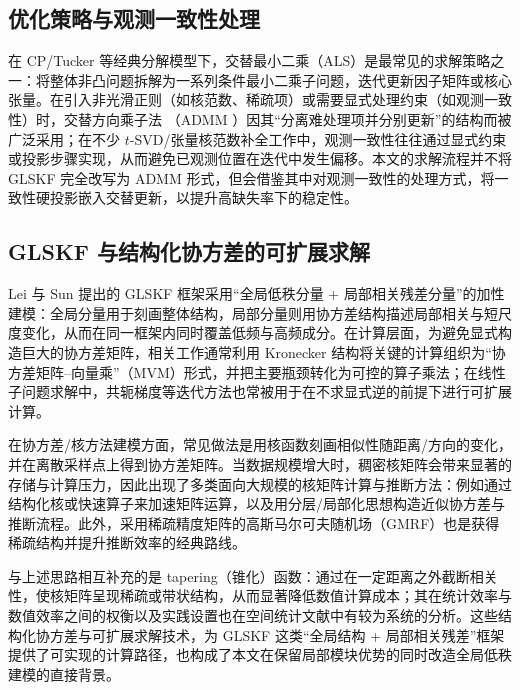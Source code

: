 \documentclass[UTF8]{ctexart}
\begin{document}
\subsection{优化策略与观测一致性处理}
在 CP/Tucker 等经典分解模型下，交替最小二乘（ALS）是最常见的求解策略之一：将整体非凸问题拆解为一系列条件最小二乘子问题，迭代更新因子矩阵或核心张量\cite{kolda2009tensor}。在引入非光滑正则（如核范数、稀疏项）或需要显式处理约束（如观测一致性）时，交替方向乘子法 （ADMM ）因其“分离难处理项并分别更新”的结构而被广泛采用\cite{boyd2011admm}；在不少 $t$-SVD/张量核范数补全工作中，观测一致性往往通过显式约束或投影步骤实现，从而避免已观测位置在迭代中发生偏移\cite{zhang2017tsvd}。本文的求解流程并不将 GLSKF 完全改写为 ADMM 形式，但会借鉴其中对观测一致性的处理方式，将一致性硬投影嵌入交替更新，以提升高缺失率下的稳定性。

\subsection{GLSKF 与结构化协方差的可扩展求解}
Lei 与 Sun 提出的 GLSKF 框架采用“全局低秩分量 + 局部相关残差分量”的加性建模：全局分量用于刻画整体结构，局部分量则用协方差结构描述局部相关与短尺度变化，从而在同一框架内同时覆盖低频与高频成分\cite{lei2024glskf}。在计算层面，为避免显式构造巨大的协方差矩阵，相关工作通常利用 Kronecker 结构将关键的计算组织为“协方差矩阵--向量乘”（MVM）形式，并把主要瓶颈转化为可控的算子乘法\cite{allen2014glsmd}；在线性子问题求解中，共轭梯度等迭代方法也常被用于在不求显式逆的前提下进行可扩展计算\cite{hestenes1952cg}。

在协方差/核方法建模方面，常见做法是用核函数刻画相似性随距离/方向的变化，并在离散采样点上得到协方差矩阵\cite{rasmussen2006gpml}。当数据规模增大时，稠密核矩阵会带来显著的存储与计算压力，因此出现了多类面向大规模的核矩阵计算与推断方法：例如通过结构化核或快速算子来加速矩阵运算\cite{wilson2015scalablegp}，以及用分层/局部化思想构造近似协方差与推断流程\cite{katzfuss2013bayesian,sang2012fullscale}。此外，采用稀疏精度矩阵的高斯马尔可夫随机场（GMRF）也是获得稀疏结构并提升推断效率的经典路线\cite{rue2005gmrf}。

与上述思路相互补充的是 tapering（锥化）函数：通过在一定距离之外截断相关性，使核矩阵呈现稀疏或带状结构，从而显著降低数值计算成本\cite{gneiting2002compact,furrer2006tapering}；其在统计效率与数值效率之间的权衡以及实践设置也在空间统计文献中有较为系统的分析\cite{kaufman2008tapering}。这些结构化协方差与可扩展求解技术，为 GLSKF 这类“全局结构 + 局部相关残差”框架提供了可实现的计算路径，也构成了本文在保留局部模块优势的同时改造全局低秩建模的直接背景\cite{lei2024glskf}。
\end{document}
